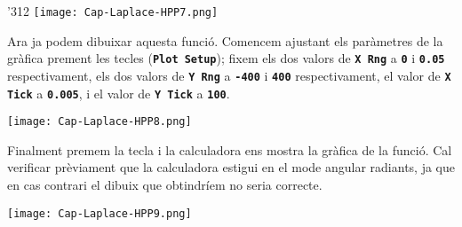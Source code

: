 \begin{exemple}
\begin{dingautolist}{'312}
            \texttt{[image: Cap-Laplace-HPP7.png]}

          \item Ara ja podem dibuixar aquesta funció. Comencem ajustant els paràmetres de la gràfica prement les tecles   (\texttt{\textbf{Plot Setup}}); fixem els dos valors de \texttt{\textbf{X Rng}} a \texttt{\textbf{0}} i \texttt{\textbf{0.05}} respectivament, els dos valors de \texttt{\textbf{Y Rng}} a \texttt{\textbf{-400}} i \texttt{\textbf{400}} respectivament, el valor de \texttt{\textbf{X Tick}} a \texttt{\textbf{0.005}}, i el valor de \texttt{\textbf{Y Tick}} a \texttt{\textbf{100}}.

            \texttt{[image: Cap-Laplace-HPP8.png]}

          \item Finalment premem la tecla  i la calculadora ens mostra la gràfica de la funció. Cal verificar prèviament que la calculadora estigui en el mode angular radiants, ja que en cas contrari el dibuix que obtindríem no seria correcte.

            \texttt{[image: Cap-Laplace-HPP9.png]}

    \end{dingautolist}

\end{exemple}
